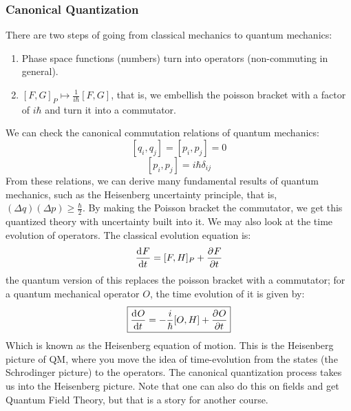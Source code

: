\documentclass[../PHYS306Notes.tex]{subfiles}
\begin{document}
\subsubsection{Canonical Quantization}
There are two steps of going from classical mechanics to quantum mechanics:
\begin{enumerate}
    \item Phase space functions (numbers) turn into operators (non-commuting in general).
    \item $[F, G]_P \mapsto \frac{1}{i \hbar}[F, G]$, that is, we embellish the poisson bracket with a factor of $i\hbar$ and turn it into a commutator.
\end{enumerate}
We can check the canonical commutation relations of quantum mechanics:
\[[q_i, q_j] = [p_i, p_j] = 0\]
\[[p_i, p_j] = i\hbar\delta_{ij}\]
From these relations, we can derive many fundamental results of quantum mechanics, such as the Heisenberg uncertainty principle, that is, $(\Delta q)(\Delta p) \geq \frac{\hbar}{2}$. By making the Poisson bracket the commutator, we get this quantized theory with uncertainty built into it. We may also look at the time evolution of operators. The classical evolution equation is:
\[\dod{F}{t} = [F, H]_P + \dpd{F}{t}\]
the quantum version of this replaces the poisson bracket with a commutator; for a quantum mechanical operator $O$, the time evolution of it is given by:
\[\boxed{\dod{O}{t} = -\frac{i}{\hbar}[O, H] + \dpd{O}{t}}\]
Which is known as the Heisenberg equation of motion. This is the Heisenberg picture of QM, where you move the idea of time-evolution from the states (the Schrodinger picture) to the operators. The canonical quantization process takes us into the Heisenberg picture. Note that one can also do this on fields and get Quantum Field Theory, but that is a story for another course.
\end{document}

